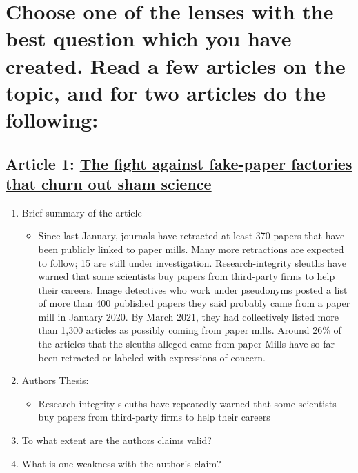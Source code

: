 \documentclass{scrartcl}
\begin{document}
\section{Choose one of the lenses with the best question which you have created. Read a few articles on the topic, and for two articles do the following:}
\label{sec:orgbaa476e}
\subsection{Article 1: \href{https://www.nature.com/articles/d41586-021-00733-5}{The fight against fake-paper factories that churn out sham science}}
\label{sec:orgcaa1464}
\begin{enumerate}
\item Brief summary of the article
\begin{itemize}
\item Since last January, journals have retracted at least 370 papers that have
been publicly linked to paper mills. Many more retractions are expected to
follow; 15 are still under investigation. Research-integrity sleuths have
warned that some scientists buy papers from third-party firms to help their
careers. Image detectives who work under pseudonyms posted a list of more
than 400 published papers they said probably came from a paper mill in
January 2020. By March 2021, they had collectively listed more than 1,300
articles as possibly coming from paper mills. Around 26\% of the articles
that the sleuths alleged came from paper Mills have so far been retracted
or labeled with expressions of concern.
\end{itemize}

\item Authors Thesis:
\begin{itemize}
\item Research-integrity sleuths have repeatedly warned that some scientists buy
papers from third-party firms to help their careers
\end{itemize}

\item To what extent are the authors claims valid?

\item What is one weakness with the author's claim?
\end{enumerate}
\end{document}
